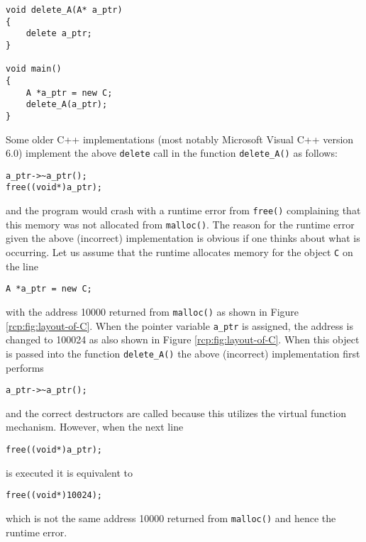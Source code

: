 {\small\begin{verbatim}
void delete_A(A* a_ptr)
{
    delete a_ptr;
}

void main()
{
    A *a_ptr = new C;
    delete_A(a_ptr);
}
\end{verbatim}}

Some older C++ implementations (most notably Microsoft Visual C++
version 6.0) implement the above {}\texttt{delete} call in the
function {}\texttt{delete\_A()} as follows:

{\small\begin{verbatim}a_ptr->~a_ptr();
free((void*)a_ptr);
\end{verbatim}}

{}\noindent{}and the program would crash with a runtime error from
{}\texttt{free()} complaining that this memory was not allocated from
{}\texttt{malloc()}.  The reason for the runtime error given the above
(incorrect) implementation is obvious if one thinks about what is
occurring.  Let us assume that the runtime allocates memory for the
object {}\texttt{C} on the line

{\small\begin{verbatim}
A *a_ptr = new C;
\end{verbatim}}

{}\noindent{}with the address 10000 returned from {}\texttt{malloc()}
as shown in Figure \ref{rcp:fig:layout-of-C}.  When the pointer
variable {}\texttt{a\_ptr} is assigned, the address is changed to
100024 as also shown in Figure \ref{rcp:fig:layout-of-C}.  When this
object is passed into the function {}\texttt{delete\_A()} the above
(incorrect) implementation first performs

{\small\begin{verbatim}
a_ptr->~a_ptr();
\end{verbatim}}

{}\noindent{}and the correct destructors are called because this
utilizes the virtual function mechanism.  However, when the next line

{\small\begin{verbatim}
free((void*)a_ptr);
\end{verbatim}}

{}\noindent{}is executed it is equivalent to

{\small\begin{verbatim}
free((void*)10024);
\end{verbatim}}

{}\noindent{}which is not the same address 10000 returned from
{}\texttt{malloc()} and hence the runtime error.


